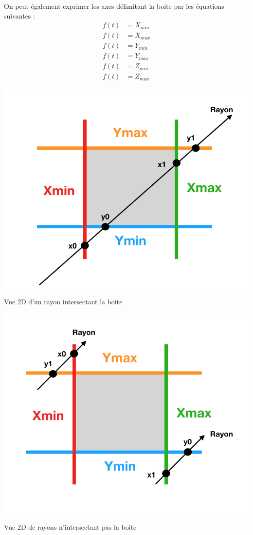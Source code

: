 On peut également exprimer les axes délimitant la boite par les équations suivantes :
\begin{align}
f(t) &= X_{min}  \\
f(t) &= X_{max}  \\
f(t) &= Y_{min}  \\
f(t) &= Y_{max} \\
f(t) &= Z_{min} \\
f(t) &= Z_{max}
\end{align}


\begin{figureth}
	\begin{subfigureth}{0.45\textwidth}
		\includegraphics[width=\linewidth]{images/AABB}
		\caption{Vue 2D d'un rayon intersectant la boite}
		\label{AABB}
	\end{subfigureth}
	\qquad
	\begin{subfigureth}{0.45\textwidth}
		\includegraphics[width=\linewidth]{images/AABB2}
		\caption{Vue 2D de rayons n'intersectant pas la boite}
		\label{AABB2}
	\end{subfigureth}
\end{figureth}

